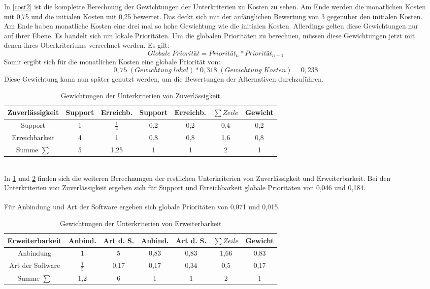 In \ref{cost2} ist die komplette Berechnung der Gewichtungen der Unterkriterien zu Kosten zu sehen. Am Ende werden die monatlichen Kosten mit 0,75 und die initialen Kosten mit 0,25 bewertet. Das deckt sich mit der anfänglichen Bewertung von 3 gegenüber den initialen Kosten. Am Ende haben monatliche Kosten eine drei mal so hohe Gewichtung wie die initialen Kosten. Allerdings gelten diese Gewichtungen nur auf ihrer Ebene. Es handelt sich um lokale Prioritäten. Um die globalen Prioritäten zu berechnen, müssen diese Gewichtungen jetzt mit denen ihres Oberkriteriums verrechnet werden. Es gilt:
\[Globale\; Priorität = Priorität_{n}*Priorität_{n-1}\]
Somit ergibt sich für die monatlichen Kosten eine globale Priorität von:
\[0,75\; (Gewichtung\; lokal) * 0,318\; (Gewichtung\; Kosten) =0,238\]
Diese Gewichtung kann nun später genutzt werden, um die Bewertungen der Alternativen durchzuführen.
\begin{table}[h!]
	\centering
	\begin{tabular}{c|cc|cc|c|c}
		Zuverlässigkeit           & Support & Erreichb. & Support& Erreichb.&$\sum Zeile$& Gewicht\\ 
		\hline
		Support & 1                &           $\frac{1}{4}$   &  0,2  &0,2 & 0,4&0,2\\
	Erreichbarkeit   &         4      & 1   &0,8  & 0,8& 1,6&0,8\\
		\hline
		Summe $\sum$    &  		5			&   1,25        & 1&1 &2 &1
	\end{tabular}
	\caption{Gewichtungen der Unterkriterien von Zuverlässigkeit}
	\label{avail2}
\end{table}\\
In \ref{avail2} und \ref{extend2} finden sich die weiteren Berechnungen der restlichen Unterkriterien von Zuverlässigkeit und Erweiterbarkeit. Bei den Unterkriterien von Zuverlässigkeit ergeben sich für Support und Erreichbarkeit globale Prioritäten von 0,046 und 0,184.\\ \\
Für Anbindung und Art der Software ergeben sich globale Prioritäten von 0,071 und 0,015. 
\begin{table}[h!]
	\centering
	\begin{tabular}{c|cc|cc|c|c}
		Erweiterbarkeit           & Anbind. & Art d. S. & Anbind.& Art d. S.&$\sum Zeile$& Gewicht\\ 
		\hline
		Anbindung & 1                &          5    &  0,83  &0,83 & 1,66&0,83\\
		Art der Software   &     $\frac{1}{5}$           & 0,17   &0,17  & 0,34& 0,5&0,17\\
		\hline
		Summe $\sum$    &  		1,2			&   6        & 1&1 &2 &1
	\end{tabular}
	\caption{Gewichtungen der Unterkriterien von Erweiterbarkeit}
	\label{extend2}
\end{table}\\

